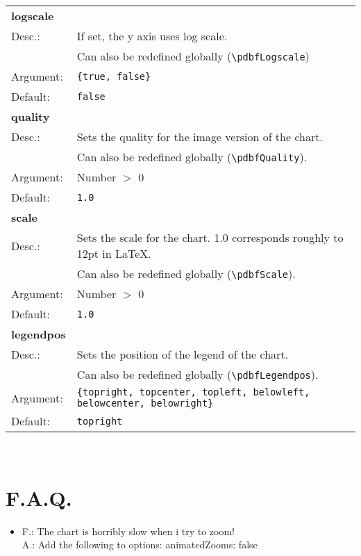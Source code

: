 \documentclass[11pt]{scrartcl}
\begin{document}
\begin{tabular}{ll}
\textbf{logscale} \\
Desc.:	&	If set, the y axis uses log scale. \\
& Can also be redefined globally (\verb|\pdbfLogscale|) \\
Argument:&	\verb|{true, false}| \\
Default:&	\verb|false| \\[4pt]

\textbf{quality} \\
Desc.:	&	Sets the quality for the image version of the chart. \\
& Can also be redefined globally (\verb|\pdbfQuality|). \\
Argument:	&Number $>$ 0 \\
Default:&	\verb|1.0| \\[4pt]

\textbf{scale} \\
Desc.:	&	Sets the scale for the chart. 1.0 corresponds roughly to 12pt in \LaTeX. \\
& Can also be redefined globally (\verb|\pdbfScale|). \\
Argument:	&Number $>$ 0 \\
Default:&	\verb|1.0| \\[4pt]

\textbf{legendpos} \\
Desc.: 	&	Sets the position of the legend of the chart. \\
& Can also be redefined globally (\verb|\pdbfLegendpos|).\\
Argument:&	\verb|{topright, topcenter, topleft, belowleft, belowcenter, belowright}| \\
Default:&	\verb|topright| \\[4pt]
\end{tabular} \\

\newpage
\section{F.A.Q.}
\begin{itemize}
\item F.: The chart is horribly slow when i try to zoom! \\
A.: Add the following to options: animatedZooms: false 
\end{itemize}
\end{document}
